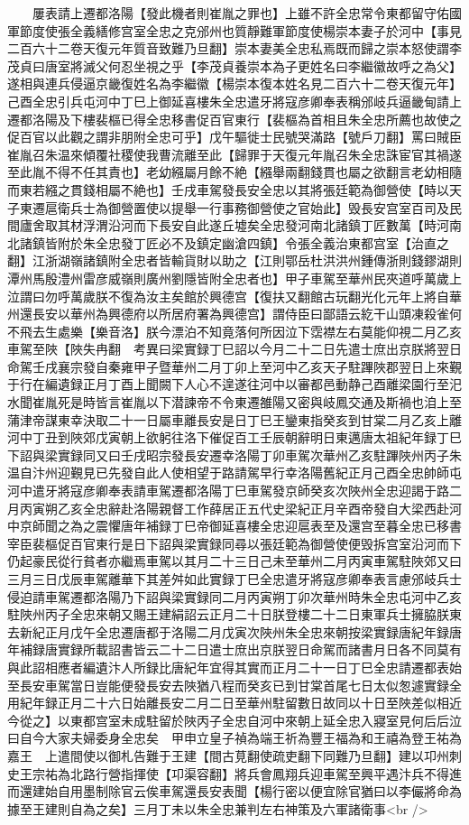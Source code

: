 　　屢表請上遷都洛陽【發此機者則崔胤之罪也】上雖不許全忠常令東都留守佑國軍節度使張全義繕修宫室全忠之克邠州也質靜難軍節度使楊崇本妻子於河中【事見二百六十二卷天復元年質音致難乃旦翻】崇本妻美全忠私焉既而歸之崇本怒使謂李茂貞曰唐室將滅父何忍坐視之乎【李茂貞養崇本為子更姓名曰李繼徽故呼之為父】遂相與連兵侵逼京畿復姓名為李繼徽【楊崇本復本姓名見二百六十二卷天復元年】己酉全忠引兵屯河中丁巳上御延喜樓朱全忠遣牙將寇彦卿奉表稱邠岐兵逼畿甸請上遷都洛陽及下樓裴樞已得全忠移書促百官東行【裴樞為首相且朱全忠所薦也故使之促百官以此觀之謂非朋附全忠可乎】戊午驅徙士民號哭滿路【號戶刀翻】罵曰賊臣崔胤召朱温來傾覆社稷使我曹流離至此【歸罪于天復元年胤召朱全忠誅宦官其禍遂至此胤不得不任其責也】老幼繦屬月餘不絶【繦舉兩翻錢貫也屬之欲翻言老幼相隨而東若繦之貫錢相屬不絶也】壬戌車駕發長安全忠以其將張廷範為御營使【時以天子東遷扈衛兵士為御營置使以提舉一行事務御營使之官始此】毁長安宫室百司及民間廬舍取其材浮渭沿河而下長安自此遂丘墟矣全忠發河南北諸鎮丁匠數萬【時河南北諸鎮皆附於朱全忠發丁匠必不及鎮定幽滄四鎮】令張全義治東都宫室【治直之翻】江浙湖嶺諸鎮附全忠者皆輸貨財以助之【江則鄂岳杜洪洪州鍾傳浙則錢鏐湖則潭州馬殷澧州雷彦威嶺則廣州劉隱皆附全忠者也】甲子車駕至華州民夾道呼萬歲上泣謂曰勿呼萬歲朕不復為汝主矣館於興德宫【復扶又翻館古玩翻光化元年上將自華州還長安以華州為興德府以所居府署為興德宫】謂侍臣曰鄙語云紇干山頭凍殺雀何不飛去生處樂【樂音洛】朕今漂泊不知竟落何所因泣下霑襟左右莫能仰視二月乙亥車駕至陜【陜失冉翻　考異曰梁實録丁巳詔以今月二十二日先遣士庶出京朕將翌日命駕壬戌襄宗發自秦雍甲子暨華州二月丁卯上至河中乙亥天子駐蹕陜郡翌日上來覲于行在編遺録正月丁酉上聞闕下人心不遑遂往河中以審都邑動静己酉離梁園行至汜水聞崔胤死是時皆言崔胤以下潜諫帝不令東遷雒陽又密與岐鳳交通及斯禍也洎上至蒲津帝謀東幸決取二十一日屬車離長安是日丁巳王鑾東指癸亥到甘棠二月乙亥上離河中丁丑到陜郊戊寅朝上欲躬往洛下催促百工壬辰朝辭明日東邁唐太祖紀年録丁巳下詔與梁實録同又曰壬戌昭宗發長安遷幸洛陽丁卯車駕次華州乙亥駐蹕陜州丙子朱温自汴州迎覲見已先發自此人使相望于路請駕早行幸洛陽舊紀正月己酉全忠帥師屯河中遣牙將寇彦卿奉表請車駕遷都洛陽丁巳車駕發京師癸亥次陜州全忠迎謁于路二月丙寅朔乙亥全忠辭赴洛陽親督工作薛居正五代史梁紀正月辛酉帝發自大梁西赴河中京師聞之為之震懼唐年補録丁巳帝御延喜樓全忠迎扈表至及還宫至暮全忠已移書宰臣裴樞促百官東行是日下詔與梁實録同尋以張廷範為御營使便毁拆宫室沿河而下仍起豪民從行貧者亦繼焉車駕以其月二十三日己未至華州二月丙寅車駕駐陜郊又曰三月三日戊辰車駕離華下其差舛如此實録丁巳全忠遣牙將寇彦卿奉表言慮邠岐兵士侵迫請車駕遷都洛陽乃下詔與梁實録同二月丙寅朔丁卯次華州時朱全忠屯河中乙亥駐陜州丙子全忠來朝又賜王建絹詔云正月二十日朕登樓二十二日東軍兵士擁脇朕東去新紀正月戊午全忠遷唐都于洛陽二月戊寅次陜州朱全忠來朝按梁實録唐紀年録唐年補録唐實録所載詔書皆云二十二日遣士庶出京朕翌日命駕而諸書月日各不同莫有與此詔相應者編遺汴人所録比唐紀年宜得其實而正月二十一日丁巳全忠請遷都表始至長安車駕當日豈能便發長安去陜猶八程而癸亥已到甘棠首尾七日太似怱遽實録全用紀年録正月二十六日始離長安二月二日至華州駐留數日故同以十日至陜差似相近今從之】以東都宫室未成駐留於陜丙子全忠自河中來朝上延全忠入寢室見何后后泣曰自今大家夫婦委身全忠矣　甲申立皇子禎為端王祈為豐王福為和王禧為登王祐為嘉王　上遣間使以御札告難于王建【間古莧翻使疏吏翻下同難乃旦翻】建以卭州刺史王宗祐為北路行營指揮使【卭渠容翻】將兵會鳳翔兵迎車駕至興平遇汴兵不得進而還建始自用墨制除官云俟車駕還長安表聞【楊行密以便宜除官猶曰以李儼將命為據至王建則自為之矣】三月丁未以朱全忠兼判左右神策及六軍諸衛事<br />
